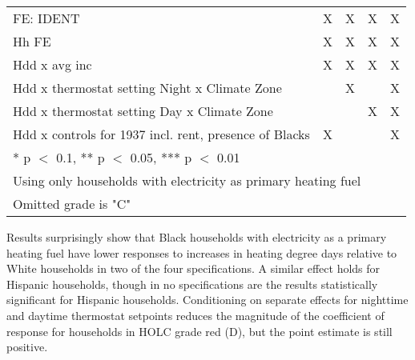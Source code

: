 \documentclass[
]{article}
\begin{document}
\begin{table}
{\begin{tabular}[t]{lcccc}
FE: IDENT & X & X & X & X\\
Hh FE & X & X & X & X\\
Hdd x avg inc & X & X & X & X\\
Hdd x thermostat setting Night x Climate Zone &  & X &  & X\\
Hdd x thermostat setting Day x Climate Zone &  &  & X & X\\
Hdd x controls for 1937 incl. rent, presence of Blacks & X &  &  & X\\
\bottomrule
\multicolumn{5}{l}{\textsuperscript{} * p $<$ 0.1, ** p $<$ 0.05, *** p $<$ 0.01}\\
\multicolumn{5}{l}{\textsuperscript{} Using only households with electricity as primary heating fuel}\\
\multicolumn{5}{l}{\textsuperscript{} Omitted grade is "C"}\\
\end{tabular}}
\end{table}

Results surprisingly show that Black households with electricity as a primary heating fuel have lower responses to increases in heating degree days
relative to White households in two of the four specifications.
A similar effect holds for Hispanic households, though in no specifications are the results statistically significant
for Hispanic households. Conditioning on separate effects for nighttime and daytime thermostat setpoints reduces the magnitude of the
coefficient of response for households in HOLC grade red (D), but the point estimate is still positive.
\end{document}
